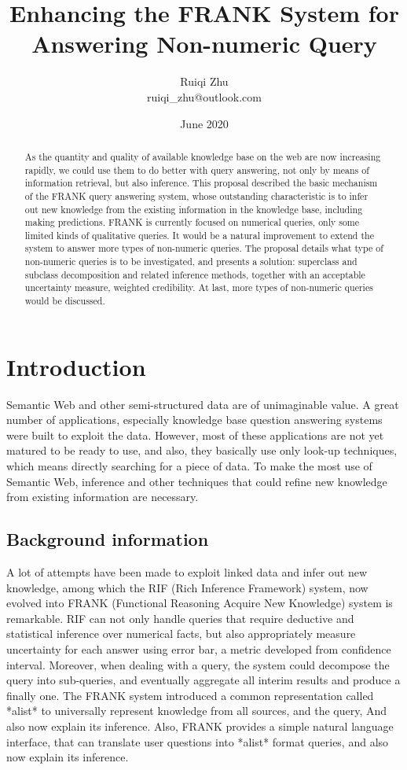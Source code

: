 \documentclass[12pt]{extarticle}
\title{Enhancing the FRANK System for Answering Non-numeric Query}
\author{Ruiqi Zhu\\
ruiqi_zhu@outlook.com\\
}
\date{June 2020}
\begin{document}
\maketitle
\setlength{\parskip}{0.5em}

\begin{abstract}
As the quantity and quality of available knowledge base on the web are now increasing rapidly, we could use them to do better with query answering, not only by means of information retrieval, but also inference. This proposal described the basic mechanism of the FRANK query answering system, whose outstanding characteristic is to infer out new knowledge from the existing information in the knowledge base, including making predictions. FRANK is currently focused on numerical queries, only some limited kinds of qualitative queries. It would be a natural improvement to extend the system to answer more types of non-numeric queries. The proposal details what type of non-numeric queries is to be investigated, and presents a solution: superclass and subclass decomposition and related inference methods, together with an acceptable uncertainty measure, weighted credibility. At last, more types of non-numeric queries would be discussed. 
\end{abstract}

\section{Introduction}
Semantic Web\cite{berners2001semantic} and other semi-structured data are of unimaginable value. A great number of applications, especially knowledge base question answering systems were built to exploit the data. However, most of these applications are not yet matured to be ready to use, and also, they basically use only look-up techniques, which means directly searching for a piece of data. To make the most use of Semantic Web, inference and other techniques that could refine new knowledge from existing information are necessary. 

\subsection{Background information}
A lot of attempts have been made to exploit linked data and infer out new knowledge, among which the RIF (Rich Inference Framework) system\cite{nuamah2016functional}, now evolved into FRANK (Functional Reasoning Acquire New Knowledge) system \cite{bundy2018automated} is remarkable. RIF can not only handle queries that require deductive and statistical inference over numerical facts, but also appropriately measure uncertainty for each answer using  error bar, a metric developed from confidence interval. Moreover, when dealing with a query, the system could decompose the query into sub-queries, and eventually aggregate all interim results and produce a finally one. The FRANK system introduced a common representation called *alist* to universally represent knowledge from all sources, and the query, And also now explain its inference. Also, FRANK provides a simple natural language interface, that can translate user questions into *alist* format queries, and also now explain its inference. 
\end{document}
